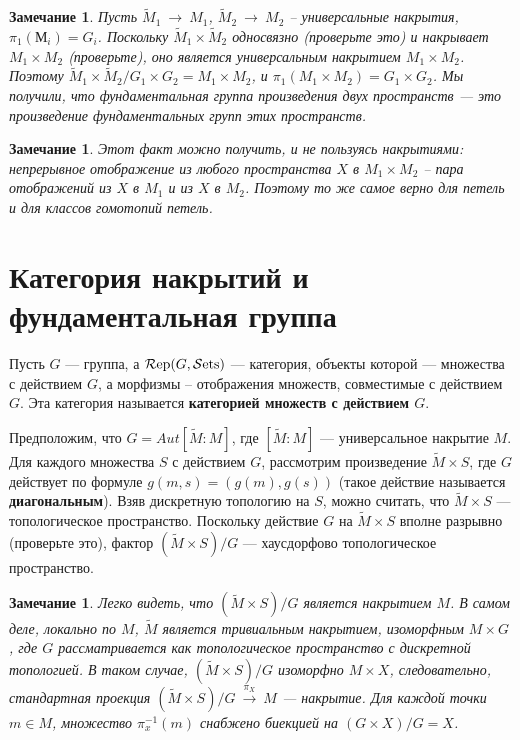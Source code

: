 \documentclass[12pt]{book}
\newcommand{\arrow}{{\:\longrightarrow\:}}
\theoremstyle{upshape}
\newtheorem{zadacha}{Задача}[chapter]
\theoremstyle{generic}
\newtheorem{remark}[teorema]{Замечание}
\def\замечание{\begin{remark}}
\def\еза{\end{remark}}
\theoremstyle{upshapenonumber}
\newcommand{\следствие}{%
     \refstepcounter{teorema}
     {\noindent\bf Следствие \thechapter.\arabic{teorema}:\ }}
\newcommand{\пример}{%
     \refstepcounter{teorema}
     {\noindent\bf Пример \thechapter.\arabic{teorema}:\ }}
\newcommand{\лемма}{%
     \refstepcounter{teorema}
     {\noindent\bf Лемма \thechapter.\arabic{teorema}:\ }}
\newcommand{\теорема}{%
     \refstepcounter{teorema}
     {\noindent\bf Теорема \thechapter.\arabic{teorema}:\ }}
\newcommand{\утверждение}{%
     \refstepcounter{teorema}
     {\noindent\bf Утверждение \thechapter.\arabic{teorema}:\ }}
\def\бф{\bf}
\def\ем{\em}
\def\задача{\begin{zadacha}}
\def\ез{\end{zadacha}}
\def\еу{\end{ukazanie}}
\def\ео{\end{opredelenie}}
\def\енум{\begin{enumerate}}
\def\ее{\end{enumerate}}
\begin{document}
\замечание
Пусть $\tilde M_1 \arrow M_1$, $\tilde M_2\arrow M_2$ --
универсальные накрытия, $\pi_1(М_i)=G_i$. 
Поскольку $\tilde M_1\times \tilde M_2$ 
односвязно (проверьте это) и накрывает $M_1\times M_2$
(проверьте), оно является универсальным накрытием
$M_1\times M_2$. Поэтому 
$\tilde M_1\times \tilde M_2/G_1\times G_2=M_1\times M_2$,
и $\pi_1(M_1\times M_2)=G_1\times G_2$. Мы получили,
что фундаментальная группа произведения двух 
пространств --- это произведение фундаментальных
групп этих пространств.
\еза

\замечание
Этот факт можно получить, и не пользуясь накрытиями: непрерывное
отображение из любого пространства $X$ в $M_1\times M_2$ --
пара отображений из $X$ в $M_1$ и из $X$ в $M_2$.
Поэтому то же самое верно для петель и для классов гомотопий
петель.
\еза



\section{Категория накрытий и фундаментальная группа}

\newcommand{\Rep}{\operatorname{{\cal R}ep}}
\newcommand{\Cov}{\operatorname{{\cal C}ov}}
\newcommand{\Sets}{\operatorname{{\cal S}ets}}

Пусть $G$ --- группа, а $\Rep(G, \Sets)$ --- категория,
объекты которой --- множества с действием $G$, а морфизмы
-- отображения множеств, совместимые с действием $G$.
Эта категория называется {\бф категорией множеств с
действием $G$}. 

Предположим, что $G= Aut[\tilde M: M]$,
где $[\tilde M: M]$ --- универсальное накрытие $M$.
Для каждого множества $S$ с действием $G$, рассмотрим
произведение $\tilde M \times S$, где $G$ действует по 
формуле $g(m,s) = (g(m), g(s))$ (такое действие называется
{\бф диагональным}). Взяв дискретную топологию на $S$,
можно считать, что $\tilde M \times S$ --- топологическое
пространство. Поскольку действие $G$ на $\tilde M \times S$ 
вполне разрывно (проверьте это), фактор 
$(\tilde M \times S)/G$ --- хаусдорфово топологическое
пространство. 

\замечание
Легко видеть, что $(\tilde M \times S)/G$
является накрытием $M$. В самом деле,
локально по $M$, $\tilde M$ является
тривиальным накрытием, изоморфным $M \times G$,
где $G$ рассматривается как топологическое
пространство с дискретной топологией. В таком случае,
$(\tilde M \times S)/G$ изоморфно $M \times X$,
следовательно, стандартная проекция
$(\tilde M \times S)/G\stackrel {\pi_X} \arrow M$ --- накрытие.
Для каждой точки $m \in M$, множество $\pi_x^{-1}(m)$
снабжено биекцией на $(G\times X)/G=X$.
\еза
\end{document}
